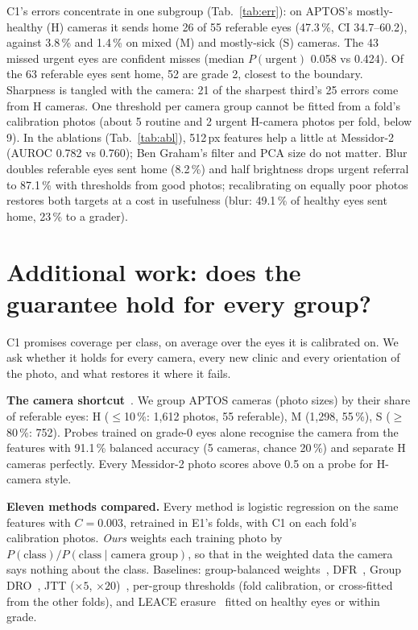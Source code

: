 \documentclass[10pt,twocolumn,letterpaper]{article}
\newcommand{\pct}{\,\%}
\begin{document}
C1's errors concentrate in one subgroup (Tab.~\ref{tab:err}): on APTOS's mostly-healthy (H) cameras it sends home 26 of 55 referable eyes (47.3\pct, CI 34.7--60.2), against 3.8\pct{} and 1.4\pct{} on mixed (M) and mostly-sick (S) cameras. The 43 missed urgent eyes are confident misses (median $P(\text{urgent})$ 0.058 vs 0.424). Of the 63 referable eyes sent home, 52 are grade 2, closest to the boundary. Sharpness is tangled with the camera: 21 of the sharpest third's 25 errors come from H cameras. One threshold per camera group cannot be fitted from a fold's calibration photos (about 5 routine and 2 urgent H-camera photos per fold, below 9). In the ablations (Tab.~\ref{tab:abl}), 512\,px features help a little at Messidor-2 (AUROC 0.782 vs 0.760); Ben Graham's filter and PCA size do not matter. Blur doubles referable eyes sent home (8.2\pct) and half brightness drops urgent referral to 87.1\pct{} with thresholds from good photos; recalibrating on equally poor photos restores both targets at a cost in usefulness (blur: 49.1\pct{} of healthy eyes sent home, 23\pct{} to a grader).

\section{Additional work: does the guarantee hold for every group?}\label{sec:extra}
C1 promises coverage per class, on average over the eyes it is calibrated on. We ask whether it holds for every camera, every new clinic and every orientation of the photo, and what restores it where it fails.

\textbf{The camera shortcut}~\cite{geirhos}. We group APTOS cameras (photo sizes) by their share of referable eyes: H ($\le$10\pct: 1,612 photos, 55 referable), M (1,298, 55\pct), S ($\ge$80\pct: 752). Probes trained on grade-0 eyes alone recognise the camera from the features with 91.1\pct{} balanced accuracy (5 cameras, chance 20\pct) and separate H cameras perfectly. Every Messidor-2 photo scores above 0.5 on a probe for H-camera style.

\textbf{Eleven methods compared.} Every method is logistic regression on the same features with $C{=}0.003$, retrained in E1's folds, with C1 on each fold's calibration photos. \emph{Ours} weights each training photo by $P(\text{class})/P(\text{class}\mid\text{camera group})$, so that in the weighted data the camera says nothing about the class. Baselines: group-balanced weights~\cite{sagawa,idrissi}, DFR~\cite{kirichenko}, Group DRO~\cite{sagawa}, JTT ($\times5$, $\times20$)~\cite{jtt}, per-group thresholds (fold calibration, or cross-fitted from the other folds), and LEACE erasure~\cite{leace} fitted on healthy eyes or within grade.
\end{document}
